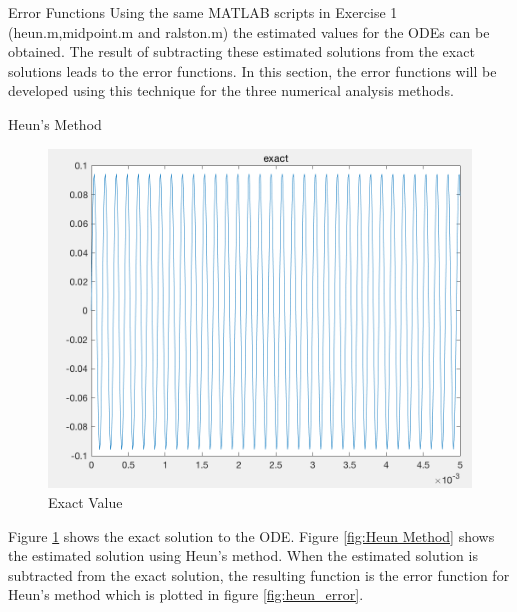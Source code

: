 \documentclass[10pt,a4paper]{article}
\begin{document}
\begin{subsection}{Error Functions} 
Using the same MATLAB scripts in Exercise 1 (heun.m,midpoint.m and ralston.m) the estimated values for the ODEs can be obtained. The result of subtracting these estimated solutions from the exact solutions leads to the error functions. In this section, the error functions will be developed using this technique for the three numerical analysis methods.

\begin{subsection}{Heun's Method}

\begin{figure}[h]
    \centering
    \includegraphics[scale=0.5]{heun_error_exact}
    \caption{Exact Value}
    \label{fig:Exact Value}
\end{figure}

Figure \ref{fig:Exact Value} shows the exact solution to the ODE. Figure \ref{fig:Heun Method} shows the estimated solution using Heun's method. When the estimated solution is subtracted from the exact solution, the resulting function is the error function for Heun's method which is plotted in figure \ref{fig:heun_error}.


\end{subsection}
\end{subsection}
\end{document}
